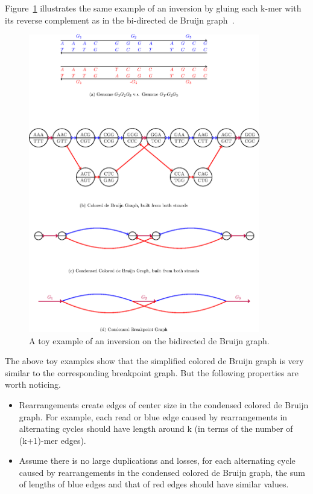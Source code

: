 \documentclass[12pt]{article}
\begin{document}
Figure~\ref{inversion2} illustrates the same example of an inversion by gluing each k-mer with its reverse complement as in the bi-directed de Bruijn graph~\cite{medvedev2007}.
\begin{figure}[H]
\begin{center}
\includegraphics[width=0.9\textwidth]{inversion_glue.eps}
\caption{A toy example of an inversion on the bidirected de Bruijn graph.}
\label{inversion2}
\end{center}
\end{figure}

The above toy examples show that the simplified colored de Bruijn graph is very similar to the corresponding breakpoint graph. 
But the following properties are worth noticing.
\begin{itemize}
 \item Rearrangements create edges of center size in the condensed colored de Bruijn graph. 
 For example, each read or blue edge caused by rearrangements in alternating cycles should have length around k (in terms of the number of (k+1)-mer edges).
 \item Assume there is no large duplications and losses, for each alternating cycle caused by rearrangements in the condensed colored de Bruijn graph, 
 the sum of lengths of blue edges and that of red edges should have similar values.
\end{itemize}
\end{document}
